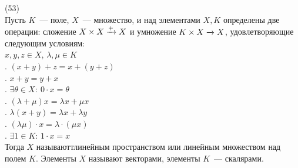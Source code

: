 (53)\\
Пусть $K$~--- поле, $X$~--- множество, и над элементами $X, K$ определены две операции: сложение $X \times X \xrightarrow[]{+} X$ и умножение $K \times X \xrightarrow[]{} X$, удовлетворяющие следующим условиям:
\\ $x, y, z \in X$, $\lambda, \mu \in K$\\
. $(x + y) + z = x + (y + z)$\\
. $x + y = y + x$\\
. $\exists \theta \in X:\ 0\cdot x = \theta$\\
. $(\lambda + \mu)x = \lambda x + \mu x$\\
. $\lambda(x + y) = \lambda x + \lambda y$\\
. $(\lambda\mu)\cdot x= \lambda \cdot (\mu x)$\\
. $\exists1 \in K:\, 1 \cdot x = x$\\
Тогда $X$ называюттлинейным пространством или линейным множеством над полем $K$. Элементы $X$ называют векторами, элементы $K$~--- скалярами.